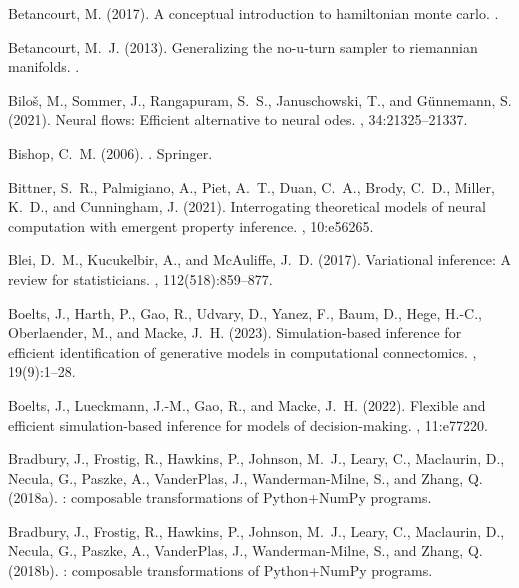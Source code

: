 \documentclass[12pt]{article}
\begin{document}
\begin{thebibliography}{}
Betancourt, M. (2017).
\newblock A conceptual introduction to hamiltonian monte carlo.
.

Betancourt, M.~J. (2013).
\newblock Generalizing the no-u-turn sampler to riemannian manifolds.
.

Bilo{\v{s}}, M., Sommer, J., Rangapuram, S.~S., Januschowski, T., and
  G{\"u}nnemann, S. (2021).
\newblock Neural flows: Efficient alternative to neural odes.
,
  34:21325--21337.

Bishop, C.~M. (2006).
.
\newblock Springer.

Bittner, S.~R., Palmigiano, A., Piet, A.~T., Duan, C.~A., Brody, C.~D., Miller,
  K.~D., and Cunningham, J. (2021).
\newblock Interrogating theoretical models of neural computation with emergent
  property inference.
, 10:e56265.

Blei, D.~M., Kucukelbir, A., and McAuliffe, J.~D. (2017).
\newblock Variational inference: A review for statisticians.
,
  112(518):859--877.

Boelts, J., Harth, P., Gao, R., Udvary, D., Yanez, F., Baum, D., Hege, H.-C.,
  Oberlaender, M., and Macke, J.~H. (2023).
\newblock Simulation-based inference for efficient identification of generative
  models in computational connectomics.
, 19(9):1--28.

Boelts, J., Lueckmann, J.-M., Gao, R., and Macke, J.~H. (2022).
\newblock Flexible and efficient simulation-based inference for models of
  decision-making.
, 11:e77220.

Bradbury, J., Frostig, R., Hawkins, P., Johnson, M.~J., Leary, C., Maclaurin,
  D., Necula, G., Paszke, A., Vander{P}las, J., Wanderman-{M}ilne, S., and
  Zhang, Q. (2018a).
: composable transformations of {P}ython+{N}um{P}y programs.

Bradbury, J., Frostig, R., Hawkins, P., Johnson, M.~J., Leary, C., Maclaurin,
  D., Necula, G., Paszke, A., Vander{P}las, J., Wanderman-{M}ilne, S., and
  Zhang, Q. (2018b).
: composable transformations of {P}ython+{N}um{P}y programs.


\end{thebibliography}
\end{document}
